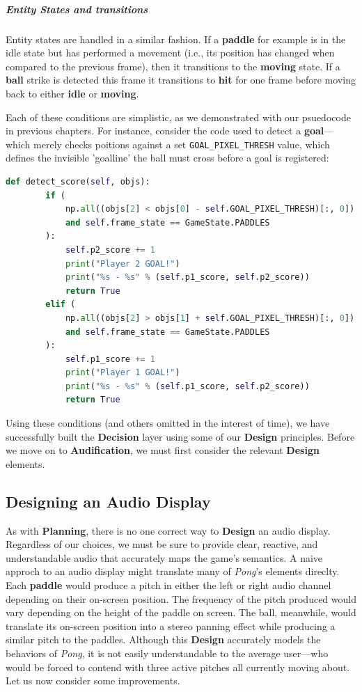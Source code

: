 \documentclass{report}
\newcommand{\plan}{\textbf{Planning}\xspace}
\newcommand{\design}{\textbf{Design}\xspace}
\newcommand{\state}[1]{\textbf{#1}}
\newcommand{\decision}{\textbf{Decision}\xspace}
\newcommand{\audio}{\textbf{Audification}\xspace}
\newcommand{\pad}{\textbf{paddle}\xspace}
\newcommand{\ball}{\textbf{ball}\xspace}
\begin{document}
\subparagraph{Entity States and transitions}
Entity states are handled in a similar fashion. If a \pad for example is in the idle state but has performed a movement (i.e., its position has changed when compared to the previous frame), then it transitions to the \state{moving} state. If a \ball strike is detected this frame it transitions to \state{hit} for one frame before moving back to either \state{idle} or \state{moving}.

Each of these conditions are simplistic, as we demonstrated with our psuedocode in previous chapters. For instance, consider the code used to detect a \state{goal}---which merely checks poitions against a set \texttt{GOAL_PIXEL_THRESH} value, which defines the invisible 'goalline' the ball must cross before a goal is registered:

\begin{lstlisting}[language=python, caption={Algorithm for detecting a \state{goal}.}]
    def detect_score(self, objs):
        if (
            np.all((objs[2] < objs[0] - self.GOAL_PIXEL_THRESH)[:, 0])
            and self.frame_state == GameState.PADDLES
        ):
            self.p2_score += 1
            print("Player 2 GOAL!")
            print("%s - %s" % (self.p1_score, self.p2_score))
            return True
        elif (
            np.all((objs[2] > objs[1] + self.GOAL_PIXEL_THRESH)[:, 0])
            and self.frame_state == GameState.PADDLES
        ):
            self.p1_score += 1
            print("Player 1 GOAL!")
            print("%s - %s" % (self.p1_score, self.p2_score))
            return True
\end{lstlisting}


Using these conditions (and others omitted in the interest of time), we have successfully built the \decision layer using some of our \design principles. Before we move on to \audio, we must first consider the relevant \design elements. 

\subsection{Designing an Audio Display}
As with \plan, there is no one correct way to \design an audio display. Regardless of our choices, we must be sure to provide clear, reactive, and understandable audio that accurately maps the game's semantics. A naive approch to an audio display might translate many of \emph{Pong}'s elements direclty. Each \pad would produce a pitch in either the left or right audio channel depending on their on-screen position. The frequency of the pitch produced would vary depending on the height of the paddle on screen. The ball, meanwhile, would translate its on-screen position into a stereo panning effect while producing a similar pitch to the paddles. Although this \design accurately models the behaviors of \emph{Pong}, it is not easily understandable to the average user---who would be forced to contend with three active pitches all currently moving about. Let us now consider some improvements.
\end{document}
